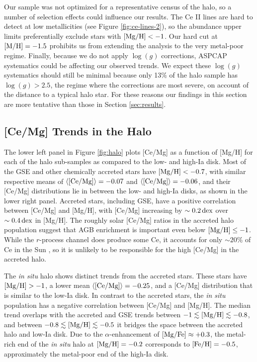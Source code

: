 \documentclass[twocolumn,twocolappendix]{aastex701}
\newcommand{\bracket}[2][H]{{\rm [#2/#1]}}
\newcommand{\dex}{\,{\rm dex}}
\begin{document}
Our sample was not optimized for a representative census of the halo, so a number of selection effects could influence our results. The Ce II lines are hard to detect at low metallicities (see Figure \ref{fig:ce-lines-2}), so the abundance upper limits preferentially exclude stars with $\bracket{Mg}<-1$. Our hard cut at $\bracket{M}=-1.5$ prohibits us from extending the analysis to the very metal-poor regime. Finally, because we do not apply $\log(g)$ corrections, ASPCAP systematics could be affecting our observed trends. We expect these $\log(g)$ systematics should still be minimal because only 13\% of the halo sample has $\log(g)>2.5$, the regime where the corrections are most severe, on account of the distance to a typical halo star. For these reasons our findings in this section are more tentative than those in Section \ref{sec:results}.

\subsection{[Ce/Mg] Trends in the Halo}

The lower left panel in Figure \ref{fig:halo} plots [Ce/Mg] as a function of [Mg/H] for each of the halo sub-samples as compared to the low- and high-Ia disk. Most of the GSE and other chemically accreted stars have $\bracket{Mg}<-0.7$, with similar respective means of $\langle\bracket[Mg]{Ce}\rangle=-0.07$ and $\langle\bracket[Mg]{Ce}\rangle=-0.06$, and their [Ce/Mg] distributions lie in between the low- and high-Ia disks, as shown in the lower right panel. Accreted stars, including GSE, have a positive correlation between [Ce/Mg] and [Mg/H], with [Ce/Mg] increasing by $\sim0.2\dex$ over $\sim0.4\dex$ in [Mg/H]. 
The roughly solar [Ce/Mg] ratios in the accreted halo population suggest that AGB enrichment is important even below $\bracket{Mg}\leq-1$. While the $r$-process channel does produce some Ce, it accounts for only $\sim20\%$ of Ce in the Sun \citep{arlandini_neutron_1999}, so it is unlikely to be responsible for the high [Ce/Mg] in the accreted halo. 

The {\it in situ} halo shows distinct trends from the accreted stars. These stars have $\bracket{Mg}>-1$, a lower mean $\langle\bracket[Mg]{Ce}\rangle=-0.25$, and a [Ce/Mg] distribution that is similar to the low-Ia disk. In contrast to the accreted stars, the {\it in situ} population has a negative correlation between [Ce/Mg] and [Mg/H]. The median trend overlaps with the accreted and GSE trends between $-1\lesssim\bracket{Mg}\lesssim-0.8$, and between $-0.8\lesssim\bracket{Mg}\lesssim-0.5$ it bridges the space between the accreted halo and low-Ia disk. Due to the $\alpha$-enhancement of $\bracket[Fe]{Mg}\approx+0.3$, the metal-rich end of the {\it in situ} halo at $\bracket{Mg}=-0.2$ corresponds to $\bracket{Fe}=-0.5$, approximately the metal-poor end of the high-Ia disk.
\end{document}
